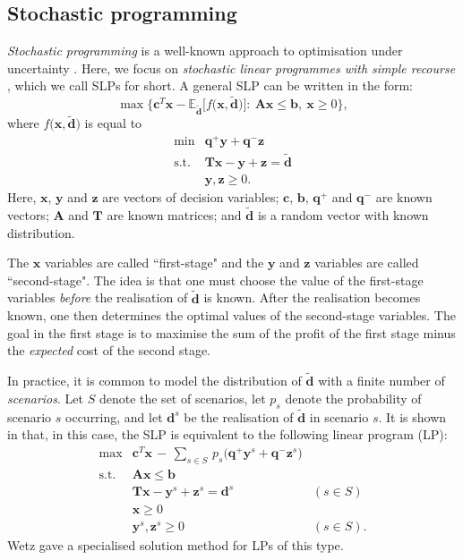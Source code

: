 \documentclass[a4paper,11pt]{article}
\begin{document}
\subsection{Stochastic programming} \label{sub:lit2}

\emph{Stochastic programming} is a well-known approach to optimisation
under uncertainty \cite{BL11,KW94,RS03}. Here, we focus on
\emph{stochastic linear programmes with simple recourse} \cite{Be55,Da55},
which we call SLPs for short. A general SLP can be written in the
form:
\[
\max \Big\{ \mathbf{c}^T \mathbf{x} - \mathbb{E}_{\mathbf{\tilde d}}
\big[ f \big( \mathbf{x}, \mathbf{\tilde d} \big) \big]: \:
\mathbf{A} \mathbf{x} \le \mathbf{b}, \: \mathbf{x} \ge 0 \Big\},
\]
where $f \big( \mathbf{x}, \mathbf{\tilde d} \big)$ is equal to
\begin{eqnarray*}
\min    & \mathbf{q^+} \mathbf{y} + \mathbf{q^-} \mathbf{z} \\
\text{s.t.} & \mathbf{T} \mathbf{x} - \mathbf{y} + \mathbf{z}
              = \mathbf{\tilde d}\\
            & \mathbf{y}, \mathbf{z} \ge 0.
\end{eqnarray*}
Here, $\mathbf{x}$, $\mathbf{y}$ and $\mathbf{z}$ are vectors of decision
variables; $\mathbf{c}$, $\mathbf{b}$, $\mathbf{q^+}$ and $\mathbf{q^-}$
are known vectors; $\mathbf{A}$ and $\mathbf{T}$ are known matrices; and
$\mathbf{\tilde d}$ is a random vector with known distribution.

The $\mathbf{x}$ variables are called ``first-stage" and the $\mathbf{y}$ and $\mathbf{z}$ variables
are called ``second-stage". The idea is that one must choose the value of
the first-stage variables \emph{before} the realisation of
$\mathbf{\tilde d}$ is known. After the realisation becomes known, one
then determines the optimal values of the second-stage variables. The goal
in the first stage is to maximise the sum of the profit of the first stage
minus the \emph{expected} cost of the second stage.

In practice, it is common to model the distribution of $\mathbf{\tilde d}$
with a finite number of \emph{scenarios}. Let $S$ denote the set of
scenarios, let $p_s$ denote the probability of scenario $s$ occurring,
and let $\mathbf{d}^s$ be the realisation of $\mathbf{\tilde d}$ in
scenario $s$. It is shown in \cite{Be55,Da55} that, in this case, the SLP
is equivalent to the following linear program (LP):
\begin{eqnarray*}
\max	    & \mathbf{c}^T \mathbf{x} \, - \, \sum_{s \in S} \, p_s
    \big( \mathbf{q^+} \mathbf{y}^s + \mathbf{q^-} \mathbf{z}^s \big)\\
\text{s.t.} & \mathbf{A} \mathbf{x} \le \mathbf{b} \\
	        & \mathbf{T} \mathbf{x} - \mathbf{y}^s + \mathbf{z}^s =
	        \mathbf{d}^s & (s \in S) \\
	        & \mathbf{x} \ge 0 \\
	        & \mathbf{y}^s, \mathbf{z}^s \ge 0 & (s \in S).
\end{eqnarray*}
Wetz \cite{We84} gave a specialised solution method for LPs of this
type.
\end{document}

